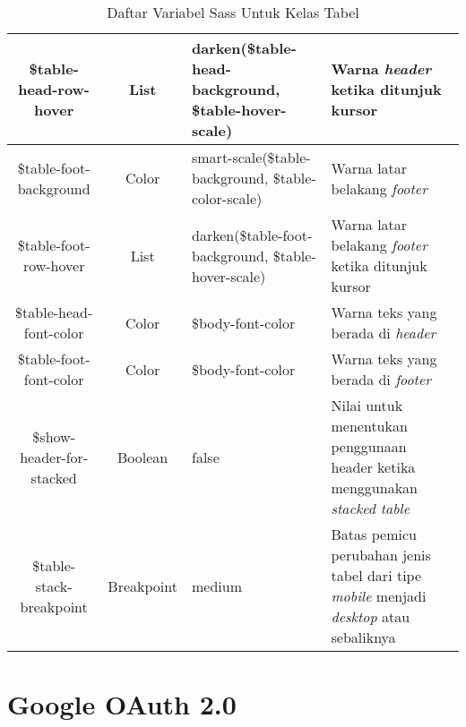 \begin{center}
\begin{table}[H]
\begin{tabular}{|c|c|p{4cm}|p{5cm}|}
			 	\hline
			 	\$table-head-row-hover & List & darken(\$table-head-background, \$table-hover-scale) & Warna \textit{header} ketika ditunjuk kursor\\
			 	\hline
			 	\$table-foot-background & Color & smart-scale(\$table-background, \$table-color-scale) & Warna latar belakang \textit{footer} \\
			 	\hline
			 	\$table-foot-row-hover & List & darken(\$table-foot-background, \$table-hover-scale) & Warna latar belakang \textit{footer} ketika ditunjuk kursor \\
			 	\hline
			 	\$table-head-font-color & Color & \$body-font-color & Warna teks yang berada di \textit{header} \\
			 	\hline
			 	\$table-foot-font-color & Color & \$body-font-color & Warna teks yang berada di \textit{footer} \\
			 	\hline
			 	\$show-header-for-stacked & Boolean & false & Nilai untuk menentukan penggunaan header ketika menggunakan \textit{stacked table} \\
			 	\hline
			 	\$table-stack-breakpoint & Breakpoint & medium & Batas pemicu perubahan jenis tabel dari tipe \textit{mobile} menjadi \textit{desktop} atau sebaliknya \\
			 	\hline
	\end{tabular}
	\caption{Daftar Variabel Sass Untuk Kelas Tabel}
	\end{table}
\end{center}

\section{Google OAuth 2.0} %
\label{googleoauth}

